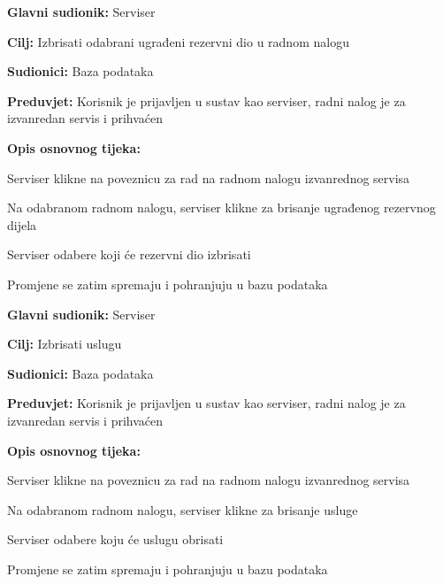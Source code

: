 \noindent {}
\begin{packed_item}
	
	\item \textbf{Glavni sudionik: } Serviser
	\item  \textbf{Cilj:} Izbrisati odabrani ugrađeni rezervni dio u radnom nalogu
	\item  \textbf{Sudionici:} Baza podataka
	\item  \textbf{Preduvjet:} Korisnik je prijavljen u sustav kao serviser, radni nalog je
	za izvanredan servis i prihvaćen
	\item  \textbf{Opis osnovnog tijeka:}
	
	\item[] \begin{packed_enum}
		
		\item Serviser klikne na poveznicu za rad na radnom nalogu izvanrednog servisa
		\item Na odabranom radnom nalogu, serviser klikne za brisanje ugrađenog rezervnog dijela
		\item Serviser odabere koji će rezervni dio izbrisati
		\item Promjene se zatim spremaju i pohranjuju u bazu podataka
		
	\end{packed_enum}
\end{packed_item}

\noindent {}
\begin{packed_item}
	
	\item \textbf{Glavni sudionik: } Serviser
	\item  \textbf{Cilj:} Izbrisati uslugu 
	\item  \textbf{Sudionici:} Baza podataka
	\item  \textbf{Preduvjet:} Korisnik je prijavljen u sustav kao serviser, radni nalog je
	za izvanredan servis i prihvaćen
	\item  \textbf{Opis osnovnog tijeka:}
	
	\item[] \begin{packed_enum}
		
		\item Serviser klikne na poveznicu za rad na radnom nalogu izvanrednog servisa
		\item Na odabranom radnom nalogu, serviser klikne za brisanje usluge
		\item Serviser odabere koju će uslugu obrisati
		\item Promjene se zatim spremaju i pohranjuju u bazu podataka
		
	\end{packed_enum}
\end{packed_item}

